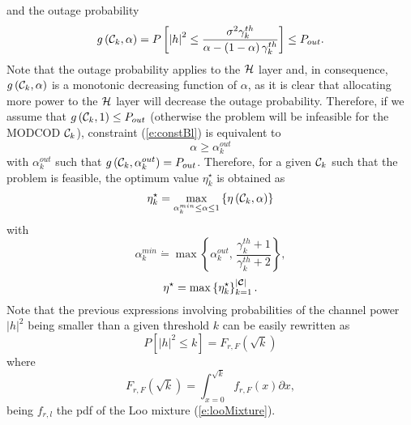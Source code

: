 \documentclass[journal,onecolumn,10pt,a4paper]{IEEEtran}
\begin{document}
and the outage probability
\begin{equation}
\label{e:constBl}
 g\left({\cal C}_k, \alpha \right) = P\left[  \left| h \right|^2 \leq \frac{\sigma^2 \gamma_k^{th}}{\alpha - \left( 1-\alpha\right)\gamma_k^{th}} \right] \leq P_{out}.
\end{equation}
Note that the outage probability applies to the ${\cal H}$ layer and, in consequence, $g\left({\cal C}_k, \alpha \right)$ is a monotonic decreasing function of $\alpha$, as it is clear that allocating more power to the ${\cal H}$ layer will decrease the outage probability. Therefore, if we assume that $g\left({\cal C}_k, 1 \right) \leq P_{out}$ (otherwise the problem will be infeasible for the MODCOD ${\cal C}_k$), constraint (\ref{e:constBl}) is equivalent to
\begin{equation}
 \alpha \geq \alpha^{out}_k
\end{equation}
with $\alpha^{out}_k$ such that $g\left({\cal C}_k, \alpha^{out}_k \right) = P_{out}$. Therefore, for a given ${\cal C}_k$ such that the problem is feasible, the optimum value $\eta^\star_k$ is obtained as
\begin{equation}
 \eta^\star_k = \max_{\alpha^{min}_k \leq \alpha \leq 1} \left\{  \eta\left({\cal C}_k, \alpha \right) \right\}
\end{equation}
with
\begin{equation}
 \alpha^{min}_k \dot = \max \left\{\alpha^{out}_k,\, \frac{\gamma_{k}^{th}+1}{\gamma_{k}^{th}+2}  \right\},
\end{equation}
\begin{equation}
 \eta^\star = \max\left\{ \eta^\star_k \right\}_{k=1}^{|\boldsymbol{\mathbf{\cal C}}|}.
\end{equation}
Note that the previous expressions involving probabilities of the channel power $\left| h \right|^2$ being smaller than a given threshold $k$ can be easily rewritten as
\begin{equation}
 P\left[  \left| h \right|^2 \leq k \right] = F_{r,F}\left( \sqrt{k}\right)
\end{equation}
where
\begin{equation}
 F_{r,F}\left( \sqrt{k}\right) = \int_{x=0}^{\sqrt{k}} f_{r,F}\left( x \right) \partial x,
\end{equation}
being $f_{r,l}$ the pdf of the Loo mixture (\ref{e:looMixture}).





 
\end{document}
